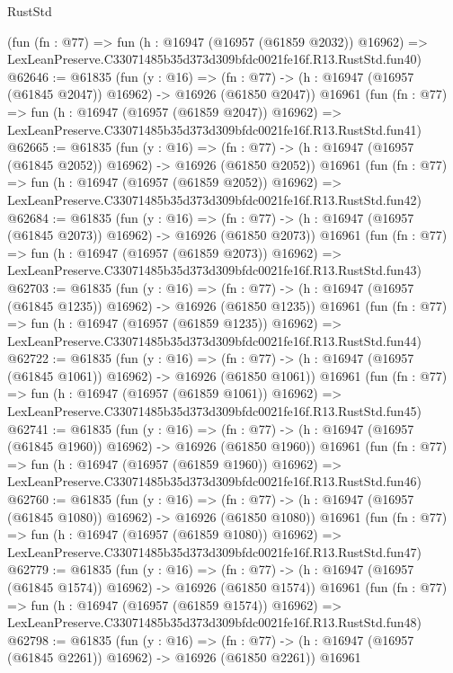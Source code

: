 \begin{lexlean}{RustStd}
\begin{coremodule}
    (fun (fn : @77) =>
    fun (h : @16947 (@16957 (@61859 @2032)) @16962) =>
    LexLeanPreserve.C33071485b35d373d309bfdc0021fe16f.R13.RustStd.fun40)
@62646 := @61835
    (fun (y : @16) =>
    (fn : @77) -> (h : @16947 (@16957 (@61845 @2047)) @16962) -> @16926 (@61850 @2047))
    @16961
    (fun (fn : @77) =>
    fun (h : @16947 (@16957 (@61859 @2047)) @16962) =>
    LexLeanPreserve.C33071485b35d373d309bfdc0021fe16f.R13.RustStd.fun41)
@62665 := @61835
    (fun (y : @16) =>
    (fn : @77) -> (h : @16947 (@16957 (@61845 @2052)) @16962) -> @16926 (@61850 @2052))
    @16961
    (fun (fn : @77) =>
    fun (h : @16947 (@16957 (@61859 @2052)) @16962) =>
    LexLeanPreserve.C33071485b35d373d309bfdc0021fe16f.R13.RustStd.fun42)
@62684 := @61835
    (fun (y : @16) =>
    (fn : @77) -> (h : @16947 (@16957 (@61845 @2073)) @16962) -> @16926 (@61850 @2073))
    @16961
    (fun (fn : @77) =>
    fun (h : @16947 (@16957 (@61859 @2073)) @16962) =>
    LexLeanPreserve.C33071485b35d373d309bfdc0021fe16f.R13.RustStd.fun43)
@62703 := @61835
    (fun (y : @16) =>
    (fn : @77) -> (h : @16947 (@16957 (@61845 @1235)) @16962) -> @16926 (@61850 @1235))
    @16961
    (fun (fn : @77) =>
    fun (h : @16947 (@16957 (@61859 @1235)) @16962) =>
    LexLeanPreserve.C33071485b35d373d309bfdc0021fe16f.R13.RustStd.fun44)
@62722 := @61835
    (fun (y : @16) =>
    (fn : @77) -> (h : @16947 (@16957 (@61845 @1061)) @16962) -> @16926 (@61850 @1061))
    @16961
    (fun (fn : @77) =>
    fun (h : @16947 (@16957 (@61859 @1061)) @16962) =>
    LexLeanPreserve.C33071485b35d373d309bfdc0021fe16f.R13.RustStd.fun45)
@62741 := @61835
    (fun (y : @16) =>
    (fn : @77) -> (h : @16947 (@16957 (@61845 @1960)) @16962) -> @16926 (@61850 @1960))
    @16961
    (fun (fn : @77) =>
    fun (h : @16947 (@16957 (@61859 @1960)) @16962) =>
    LexLeanPreserve.C33071485b35d373d309bfdc0021fe16f.R13.RustStd.fun46)
@62760 := @61835
    (fun (y : @16) =>
    (fn : @77) -> (h : @16947 (@16957 (@61845 @1080)) @16962) -> @16926 (@61850 @1080))
    @16961
    (fun (fn : @77) =>
    fun (h : @16947 (@16957 (@61859 @1080)) @16962) =>
    LexLeanPreserve.C33071485b35d373d309bfdc0021fe16f.R13.RustStd.fun47)
@62779 := @61835
    (fun (y : @16) =>
    (fn : @77) -> (h : @16947 (@16957 (@61845 @1574)) @16962) -> @16926 (@61850 @1574))
    @16961
    (fun (fn : @77) =>
    fun (h : @16947 (@16957 (@61859 @1574)) @16962) =>
    LexLeanPreserve.C33071485b35d373d309bfdc0021fe16f.R13.RustStd.fun48)
@62798 := @61835
    (fun (y : @16) =>
    (fn : @77) -> (h : @16947 (@16957 (@61845 @2261)) @16962) -> @16926 (@61850 @2261))
    @16961

\end{coremodule}
\end{lexlean}
